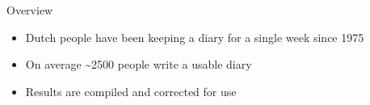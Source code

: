 \documentclass[aspectratio=169]{beamer}
\begin{document}
    {
    \begin{frame}{Overview}
        \begin{itemize}
            \item Dutch people have been keeping a diary for a single week since 1975
            \item On average \textasciitilde2500 people write a usable diary
            \item Results are compiled and corrected for use
        \end{itemize}
    \end{frame}
    }
\end{document}
